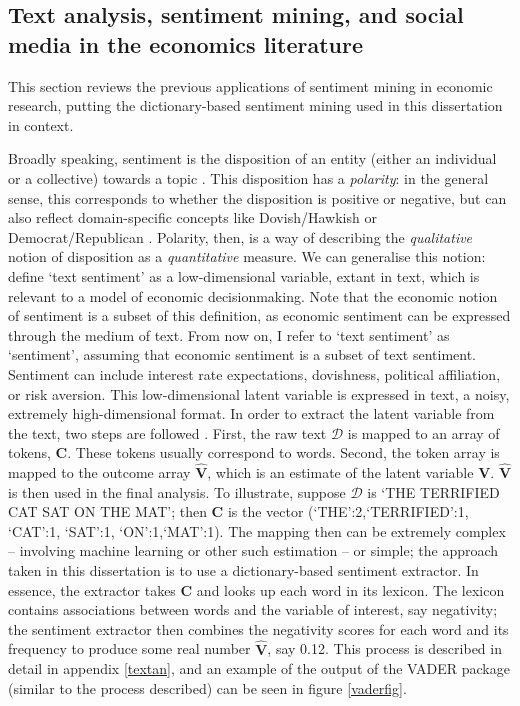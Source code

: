 \documentclass[12pt,a4]{article}
\begin{document}
\subsection{Text analysis, sentiment mining, and social media in the economics literature}\label{sentmining}
This section reviews the previous applications of sentiment mining in economic research, putting the dictionary-based sentiment mining used in this dissertation in context.

Broadly speaking, sentiment is the disposition of an entity (either an individual or a collective) towards a topic \parencite{algabaEconometricsMeetsSentiment2020}. This disposition has a \textit{polarity}: in the general sense, this corresponds to whether the disposition is positive or negative, but can also reflect domain-specific concepts like Dovish/Hawkish \parencite{picaultWordsAreNot2017} or Democrat/Republican \parencite{gentzkowWhatDrivesMedia2010}. Polarity, then, is a way of describing the \textit{qualitative} notion of disposition as a \textit{quantitative} measure. We can generalise this notion: define `text sentiment' as a low-dimensional variable, extant in text, which is relevant to a model of economic decisionmaking. Note that the economic notion of sentiment is a subset of this definition, as economic sentiment can be expressed through the medium of text. From now on, I refer to `text sentiment' as `sentiment', assuming that economic sentiment is a subset of text sentiment. Sentiment can include interest rate expectations, dovishness, political affiliation, or risk aversion. This low-dimensional latent variable is expressed in text, a noisy, extremely high-dimensional format. In order to extract the latent variable from the text, two steps are followed \parencite{gentzkowTextData2019}.  First, the raw text \(\mathcal{D}\) is mapped to an array of tokens, \(\mathbf{C}\). These tokens usually correspond to words. Second, the token array is mapped to the outcome array \(\hat{\mathbf{V}}\), which is an estimate of the latent variable \(\mathbf{V}\). \(\hat{\mathbf{V}} \) is then used in the final analysis. To illustrate, suppose \(\mathcal{D}\) is `THE TERRIFIED CAT SAT ON THE MAT'; then \(\mathbf{C}\) is the vector (`THE':2,`TERRIFIED':1, `CAT':1, `SAT':1, `ON':1,`MAT':1). The mapping then can be extremely complex -- involving machine learning or other such estimation -- or simple; the approach taken in this dissertation is to use a dictionary-based sentiment extractor. In essence, the extractor takes \(\mathbf{C}\) and looks up each word in its lexicon. The lexicon contains associations between words and the variable of interest, say negativity; the sentiment extractor then combines the negativity scores for each word and its frequency to produce some real number \(\hat{\mathbf{V}}\), say 0.12.  This process is described in detail in appendix \ref{textan}, and an example of the output of the VADER package (similar to the process described) can be seen in figure \ref{vaderfig}.
\end{document}
